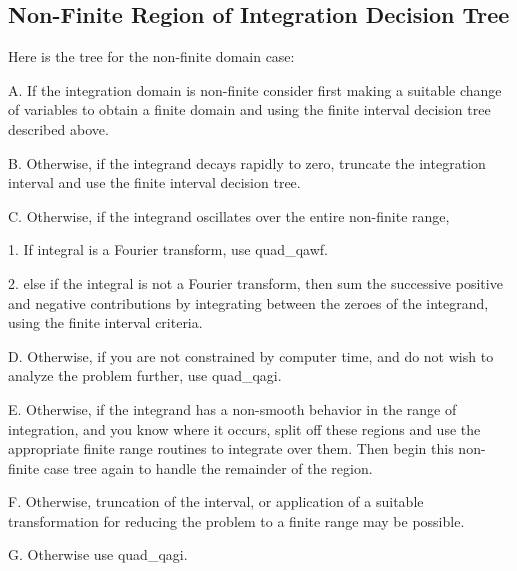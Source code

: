 \documentclass[12pt]{article}
\begin{document}
\subsection{Non-Finite Region of Integration Decision Tree } \label{inf}   
Here is the tree for the non-finite domain case:
\begin{myVerbatim2s} 
A.  If the integration domain is non-finite consider first making a
       suitable change of variables to obtain a finite domain and 
	   using the finite interval decision tree described above.

B.  Otherwise, if the integrand decays rapidly to zero, truncate the
      integration interval and use the finite interval decision tree. 
	  
C.  Otherwise, if the integrand oscillates over the entire non-finite range,

       1. If integral is a Fourier transform, use quad_qawf. 

       2. else if the integral is not a Fourier transform, then sum the
           successive positive and negative contributions by integrating
           between the zeroes of the integrand, using the finite 
           interval criteria.
  
D.  Otherwise, if you are not constrained by computer time, and do not
     wish to analyze the problem further, use quad_qagi. 

E.  Otherwise, if the integrand has a non-smooth behavior in the range of
     integration, and you know where it occurs, split off these regions
     and use the appropriate finite range routines to integrate over them.
     Then begin this non-finite case tree again to handle the remainder
	 of the region. 

F.  Otherwise, truncation of the interval, or application of a suitable
     transformation for reducing the problem to a finite range may be 
     possible.
		  
G.  Otherwise use quad_qagi. 
\end{myVerbatim2s}
\end{document}
